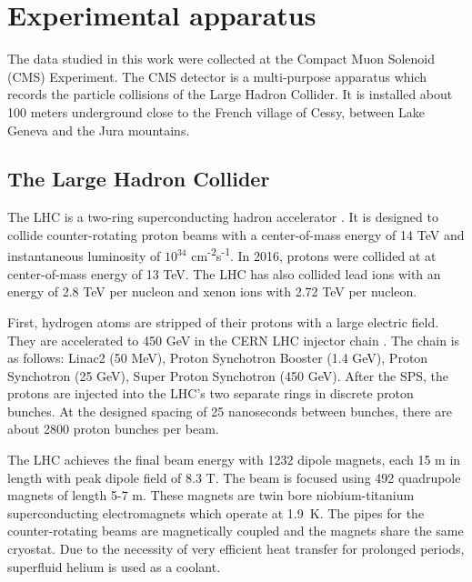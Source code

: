 \chapter{Experimental apparatus}

The data studied in this work were collected at the Compact Muon Solenoid (CMS) Experiment.
The CMS detector is a multi-purpose apparatus which records the particle collisions
of the Large Hadron Collider.
It is installed about 100 meters underground close to the French village of Cessy,
between Lake Geneva and the Jura mountains.


\section{The Large Hadron Collider}

The LHC is a two-ring superconducting hadron accelerator \cite{lhcmachine}.
It is designed to collide counter-rotating proton beams with a center-of-mass energy of 14 TeV
and instantaneous luminosity of $10^{34}$ cm\textsuperscript{-2}s\textsuperscript{-1}.
In 2016, protons were collided at at center-of-mass energy of 13 TeV. 
The LHC has also collided lead ions with an energy of 2.8 TeV per nucleon and xenon ions with 2.72 TeV per nucleon.

First, hydrogen atoms are stripped of their protons with a large electric field.
They are accelerated to 450 GeV in the CERN LHC injector chain \cite{lhcinjector}.
The chain is as follows: Linac2 (50 MeV), Proton Synchotron Booster (1.4 GeV), Proton Synchotron (25 GeV), Super Proton Synchotron (450 GeV).
After the SPS, the protons are injected into the LHC's two separate rings in discrete proton bunches.
At the designed spacing of 25 nanoseconds between bunches, there are about 2800 proton bunches per beam.

The LHC achieves the final beam energy with 1232 dipole magnets, each 15 m in length with peak dipole field of 8.3 T.
The beam is focused using 492 quadrupole magnets of length 5-7 m.
These magnets are twin bore niobium-titanium superconducting electromagnets which operate at 1.9\textdegree~K.
The pipes for the counter-rotating beams are magnetically coupled and the magnets share the same cryostat.
Due to the necessity of very efficient heat transfer for prolonged periods, superfluid helium is used as a coolant.


